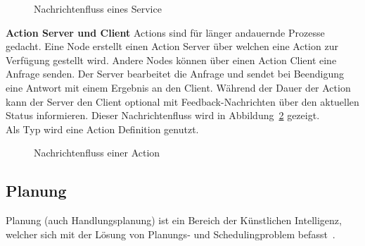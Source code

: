 \begin{figure}[ht!]
    \centering
    \caption{Nachrichtenfluss eines Service}
    \label{fig:service}
\end{figure}
\textbf{Action Server und Client} Actions sind für länger andauernde Prozesse gedacht.
Eine Node erstellt einen Action Server über welchen eine Action zur Verfügung gestellt wird.
Andere Nodes können über einen Action Client eine Anfrage senden.
Der Server bearbeitet die Anfrage und sendet bei Beendigung eine Antwort mit einem Ergebnis an den Client.
Während der Dauer der Action kann der Server den Client optional mit Feedback-Nachrichten über den aktuellen Status informieren.
Dieser Nachrichtenfluss wird in Abbildung~\ref{fig:action} gezeigt.\\
Als Typ wird eine Action Definition genutzt.\\
\begin{figure}[ht!]
    \centering
    \caption{Nachrichtenfluss einer Action}
    \label{fig:action}
\end{figure}
\subsection {Planung}
Planung (auch Handlungsplanung) ist ein Bereich der Künstlichen Intelligenz, welcher sich mit der Lösung von Planungs- und Schedulingproblem befasst~\cite{aiplanning}.
